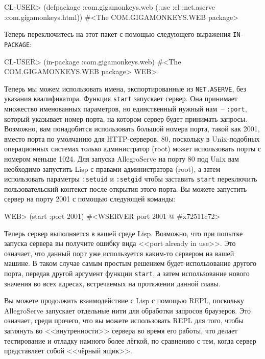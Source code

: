 \begin{myverb}
CL-USER> (defpackage :com.gigamonkeys.web
            (:use :cl :net.aserve :com.gigamonkeys.html))
#<The COM.GIGAMONKEYS.WEB package>
\end{myverb}

Теперь переключитесь на этот пакет с помощью следующего выражения \lstinline{IN-PACKAGE}:

\begin{myverb}
CL-USER> (in-package :com.gigamonkeys.web)
#<The COM.GIGAMONKEYS.WEB package>
WEB>
\end{myverb} 

Теперь мы можем использовать имена, экспортированные из \lstinline{NET.ASERVE}, без указания
квалификатора. Функция \lstinline{start} запускает сервер. Она принимает множество именованных
параметров, но единственный нужный нам~-- \lstinline{:port}, который указывает номер порта, на
котором сервер будет принимать запросы.  Возможно, вам понадобится использовать большой
номера порта, такой как 2001, вместо порта по умолчанию для HTTP-серверов, 80, поскольку в
Unix-подобных операционных системах только администратор (root) может использовать порты с
номером меньше 1024. Для запуска AllegroServe на порту 80 под Unix вам необходимо
запустить Lisp с правами администратора (root), а затем использовать параметры
\lstinline{:setuid} и \lstinline{:setgid} чтобы заставить \lstinline{start} переключить пользовательский
контекст после открытия этого порта. Вы можете запустить сервер на порту 2001 с помощью
следующей команды:

\begin{myverb}
WEB> (start :port 2001)
#<WSERVER port 2001 @ #x72511c72>
\end{myverb}

Теперь сервер выполняется в вашей среде Lisp. Возможно, что при попытке запуска сервера вы
получите ошибку вида <<port already in use>>. Это означает, что данный порт уже
используется каким-то сервером на вашей машине. В таком случае самым простым решением
будет использование другого порта, передав другой аргумент функции \lstinline{start}, а затем
использование нового значения во всех адресах, встречаемых на протяжении данной главы.

Вы можете продолжить взаимодействие с Lisp с помощью REPL, поскольку AllegroServe
запускает отдельные нити для обработки запросов браузеров. Это означает, среди прочего,
что вы можете использовать REPL для того, чтобы заглянуть во <<внутренности>> сервера во
время его работы, что делает тестирование и отладку намного более лёгкой, по сравнению с
тем, когда сервер представляет собой <<чёрный ящик>>.

